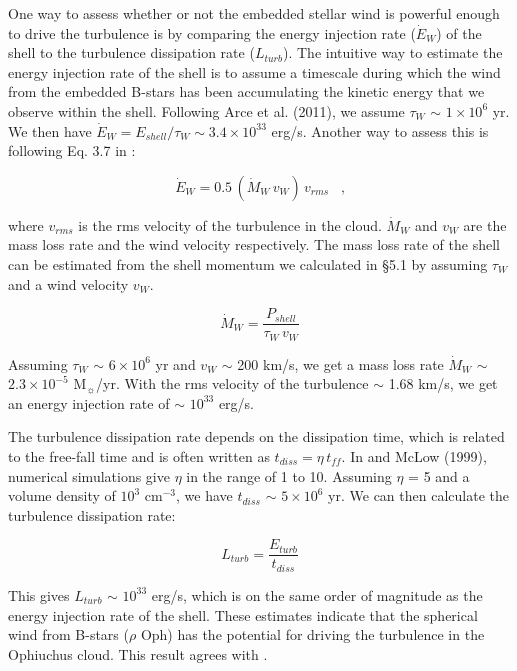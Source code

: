 \documentclass[11pt,a4paper]{emulateapj}
\begin{document}
One way to assess whether or not the embedded stellar wind is powerful enough to drive the turbulence is by comparing the energy injection rate ($\dot E_W$) of the shell to the turbulence dissipation rate ($L_{turb}$). The intuitive way to estimate the energy injection rate of the shell is to assume a timescale during which the wind from the embedded B-stars has been accumulating the kinetic energy that we observe within the shell. Following Arce et al. (2011), we assume $\tau_W$ $\sim$ $1\times10^6$ yr. We then have $\dot E_W = E_{shell}/\tau_W \sim 3.4\times10^{33}$ erg/s. Another way to assess this is following Eq. 3.7 in \citet{McKee_1989}:

\begin{equation}
\dot E_W = 0.5\,(\dot M_W\,v_W)\,v_{rms}\;\;\;\text{,}
\end{equation}

where $v_{rms}$ is the rms velocity of the turbulence in the cloud. $\dot M_W$ and $v_W$ are the mass loss rate and the wind velocity respectively. The mass loss rate of the shell can be estimated from the shell momentum we calculated in \S5.1 by assuming $\tau_W$ and a wind velocity $v_W$.

\begin{equation}
\dot M_W = \frac{P_{shell}}{\tau_W\,v_W}
\end{equation}

Assuming $\tau_W$ $\sim$ $6\times10^6$ yr and $v_W$ $\sim$ 200 km/s, we get a mass loss rate $\dot M_W$ $\sim$ $2.3\times10^{-5}$ M$_{\sun}$/yr. With the rms velocity of the turbulence $\sim$ 1.68 km/s, we get an energy injection rate of $\sim$ $10^{33}$ erg/s.

The turbulence dissipation rate depends on the dissipation time, which is related to the free-fall time and is often written as $t_{diss} = \eta\,t_{ff}$. In \citet{McKee_1989} and McLow (1999), numerical simulations give $\eta$ in the range of 1 to 10. Assuming $\eta$ = 5 and a volume density of $10^3$ cm$^{-3}$, we have $t_{diss}$ $\sim$ $5\times10^6$ yr. We can then calculate the turbulence dissipation rate:

\begin{equation}
L_{turb} = \frac{E_{turb}}{t_{diss}}
\end{equation}

This gives $L_{turb}$ $\sim$ $10^{33}$ erg/s, which is on the same order of magnitude as the energy injection rate of the shell. These estimates indicate that the spherical wind from B-stars ($\rho$ Oph) has the potential for driving the turbulence in the Ophiuchus cloud. This result agrees with \citet{Arce_2011}.
\end{document}
